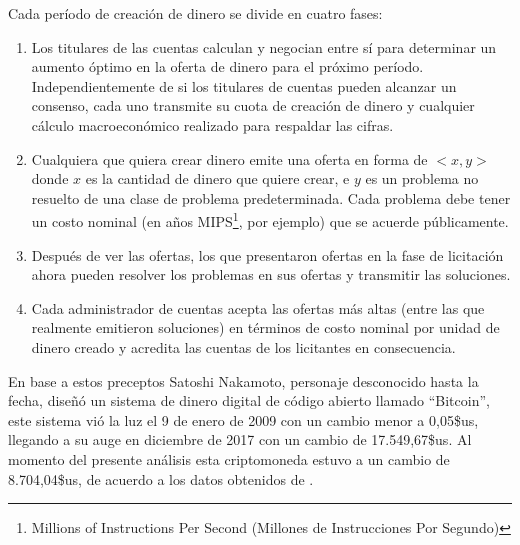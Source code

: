 \documentclass[../main/main.tex]{subfiles}
\begin{document}
  Cada período de creación de dinero se divide en cuatro fases:

  \begin{enumerate}
    \item Los titulares de las cuentas calculan y negocian entre sí para determinar un aumento óptimo en la oferta de dinero para el próximo período. Independientemente de si los titulares de cuentas pueden alcanzar un consenso, cada uno transmite su cuota de creación de dinero y cualquier cálculo macroeconómico realizado para respaldar las cifras.
    \item Cualquiera que quiera crear dinero emite una oferta en forma de $<x, y>$ donde $x$ es la cantidad de dinero que quiere crear, e $y$ es un problema no resuelto de una clase de problema predeterminada. Cada problema debe tener un costo nominal (en años MIPS\footnote{Millions of Instructions Per Second (Millones de Instrucciones Por Segundo)}, por ejemplo) que se acuerde públicamente.
    \item Después de ver las ofertas, los que presentaron ofertas en la fase de licitación ahora pueden resolver los problemas en sus ofertas y transmitir las soluciones.
    \item Cada administrador de cuentas acepta las ofertas más altas (entre las que realmente emitieron soluciones) en términos de costo nominal por unidad de dinero creado y acredita las cuentas de los licitantes en consecuencia.
  \end{enumerate}

  En base a estos preceptos Satoshi Nakamoto, personaje desconocido hasta la fecha, diseñó un sistema de dinero digital de código abierto llamado ``Bitcoin'', este sistema vió la luz el 9 de enero de 2009 con un cambio menor a 0,05\$us, llegando a su auge en diciembre de 2017 con un cambio de 17.549,67\$us. Al momento del presente análisis esta criptomoneda estuvo a un cambio de 8.704,04\$us, de acuerdo a los datos obtenidos de \cite{web:bitstamp}.
\end{document}
